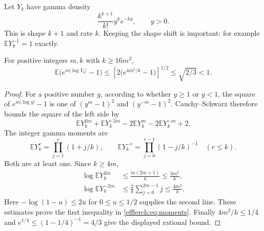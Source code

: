 Let $Y_k$ have gamma density
\[
 \frac{k^{k+1}}{k!}y^k e^{-ky},\qquad y>0.
\]
This is shape $k+1$ and rate $k$.  Keeping the shape shift is important:
for example $\mathbb E Y_k^{-1}=1$ exactly.

\begin{lemma}
\label{efflerch:lem:moments}
For positive integers $m,k$ with $k\geq16m^2$,
\begin{equation}\label{efflerch:eq:moments}
 \mathbb E\bigl(e^{m|\log Y_k|}-1\bigr)
 \leq\left[2\bigl(e^{4m^2/k}-1\bigr)\right]^{1/2}
 \leq\sqrt{2/3}<1.
\end{equation}
\end{lemma}
\begin{proof}
For a positive number $y$, according to whether $y\geq1$ or $y<1$,
the square of $e^{m|\log y|}-1$ is one of
$(y^m-1)^2$ and $(y^{-m}-1)^2$.  Cauchy--Schwarz therefore bounds
the square of the left side by
\[
 \mathbb E Y_k^{2m}+\mathbb E Y_k^{-2m}
  -2\mathbb E Y_k^m-2\mathbb E Y_k^{-m}+2.
\]
The integer gamma moments are
\[
 \mathbb E Y_k^r=\prod_{j=1}^r(1+j/k),\qquad
 \mathbb E Y_k^{-r}=\prod_{j=0}^{r-1}(1-j/k)^{-1}\quad(r\leq k).
\]
Both are at least one.  Since $k\geq4m$,
\begin{align*}
 \log\mathbb E Y_k^{2m}
  &\leq\frac{m(2m+1)}k\leq\frac{3m^2}k,\\
 \log\mathbb E Y_k^{-2m}
  &\leq\frac2k\sum_{j=0}^{2m-1}j
   \leq\frac{4m^2}k.
\end{align*}
Here $-\log(1-u)\leq2u$ for $0\leq u\leq1/2$ supplies the second
line.  These estimates prove the first inequality in
\eqref{efflerch:eq:moments}.  Finally $4m^2/k\leq1/4$ and
$e^{1/4}\leq(1-1/4)^{-1}=4/3$ give the displayed rational bound.
\end{proof}


